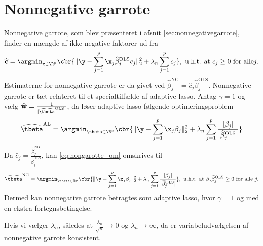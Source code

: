 \section{Nonnegative garrote} \label{sec:asymptotics_nonnegative}
Nonnegative garrote, som blev præsenteret i afsnit \ref{sec:nonnegativegarrote}, finder en mængde af ikke-negative faktorer ud fra
\begin{align}
\widehat{\mathbf{c}} = \argmin_{\mathbf{c} \in \R^p} \cbr{\Vert \y - \sum_{j=1}^p \x_j \widehat{\beta}_j^\text{OLS} c_j \Vert_2^2 + \lambda_n \sum_{j=1}^p c_j}, \ \text{u.h.t. at } c_j \geq 0 \text{ for alle} j. \label{eq:nongarotte_om}
\end{align}
Estimaterne for nonnegative garrote er da givet ved \(\widehat{\beta}_j^\text{NG} = \widehat{c}_j \widehat{\beta}_j^\text{OLS}\).
Nonnegative garrote er tæt relateret til et specialtilfælde af adaptive lasso.
Antag \(\gamma=1\) og vælg \(\widehat{\mathbf{w}}=\frac{1}{ \vert \widehat{\tbeta}^{\text{OLS}} \vert }\), da løser adaptive lasso følgende optimeringsproblem
\begin{align}
\widehat{\tbeta}^\text{AL} = \argmin_{\tbeta \in \R^p} \cbr{ \Vert \y - \sum_{j=1}^p \x_j \beta_j \Vert_2^2 + \lambda_n \sum_{j=1}^p \frac{\vert \beta_j \vert }{\vert \widehat{\beta}_j^\text{OLS} \vert }} \label{eq:AL8}
\end{align}
Da \(\widehat{c}_j = \frac{\widehat{\beta}_j^\text{NG}}{\widehat{\beta}_j^\text{OLS}}\), kan \eqref{eq:nongarotte_om} omskrives til
\begin{align*}
\widehat{\tbeta}^\text{NG} =\argmin_{\tbeta \in \mathbb{R}^p}  \cbr{ \Vert \y - \sum_{j=1}^p \x_j \beta_j \Vert_2^2 + \lambda_n \sum_{j=1}^p  \frac{\vert \beta_j \vert}{\vert \widehat{\beta}_j^\text{OLS} \vert }}, \ \text{u.h.t. at } \beta_j \widehat{\beta}_j^\text{OLS} \geq 0 \text{ for alle } j.
\end{align*}
Dermed kan nonnegative garrote betragtes som adaptive lasso, hvor \(\gamma=1\) og med en ekstra fortegnsbetingelse.
%
\begin{cor}
Hvis vi vælger \(\lambda_n\), således at \(\frac{\lambda_n}{\sqrt{n}} \rightarrow 0\) og \(\lambda_n \rightarrow \infty\), da er variabeludvælgelsen af nonnegative garrote konsistent.
\end{cor}
%
